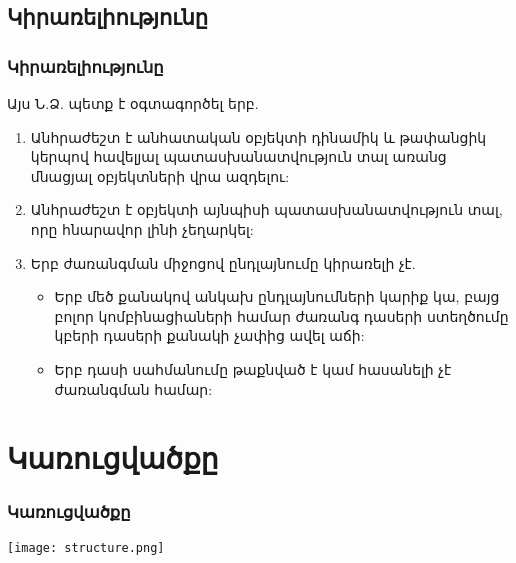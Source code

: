 \documentclass{beamer}
\begin{document}
\subsection{Կիրառելիությունը}
\begin{frame}\frametitle{Կիրառելիությունը}
Այս Ն.Ձ. պետք է օգտագործել երբ.
\vfill
\scriptsize
{}
\begin{enumerate}
    \item Անհրաժեշտ է անհատական օբյեկտի դինամիկ և թափանցիկ կերպով
    հավելյալ պատասխանատվություն տալ առանց մնացյալ օբյեկտների վրա ազդելու: \vfill
    \item Անհրաժեշտ է օբյեկտի այնպիսի պատասխանատվություն տալ,
    որը հնարավոր լինի չեղարկել: \vfill
    \item Երբ ժառանգման միջոցով ընդլայնումը կիրառելի չէ. \vfill
    \begin{itemize}
        \item Երբ մեծ քանակով անկախ ընդլայնումների կարիք կա, բայց բոլոր կոմբինացիաների
        համար ժառանգ դասերի ստեղծումը կբերի դասերի քանակի չափից ավել աճի: \vfill
        \item Երբ դասի սահմանումը թաքնված է կամ հասանելի չէ ժառանգման համար:
    \end{itemize}
\end{enumerate}
\end{frame}

\section{Կառուցվածքը}
\begin{frame}\frametitle{Կառուցվածքը}
\begin{center}
    \texttt{[image: structure.png]}
\end{center}
\end{frame}
\end{document}
